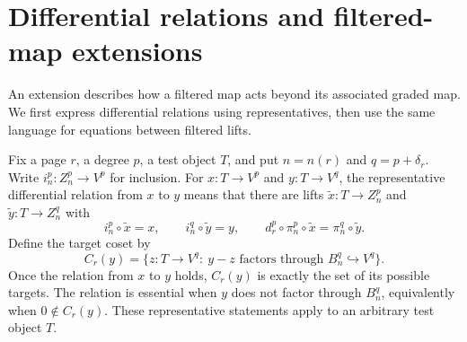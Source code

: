 \section{Differential relations and filtered-map extensions}

An extension describes how a filtered map acts beyond its associated
graded map. We first express differential relations using representatives,
then use the same language for equations between filtered lifts.

\begin{definition}
\label{sem:SpectralSequence:ambient-differential}
Fix a page $r$, a degree $p$, a test object $T$, and put
$n=n(r)$ and $q=p+\delta_r$. Write $i_n^p:Z_n^p\to V^p$ for inclusion.
For $x:T\to V^p$ and $y:T\to V^q$, the representative differential
relation from $x$ to $y$ means that there are lifts
$\widetilde x:T\to Z_n^p$ and $\widetilde y:T\to Z_n^q$ with
\[
 i_n^p\circ\widetilde x=x,\qquad
 i_n^q\circ\widetilde y=y,\qquad
 d_r^p\circ\pi_n^p\circ\widetilde x=\pi_n^q\circ\widetilde y.
\]
Define the target coset by
\[
 C_r(y)=\{z:T\to V^q:\ y-z\text{ factors through }B_n^q\hookrightarrow V^q\}.
\]
Once the relation from $x$ to $y$ holds, $C_r(y)$ is exactly the set of
its possible targets. The relation is essential when $y$ does not
factor through $B_n^q$, equivalently when $0\notin C_r(y)$. These
representative statements apply to an arbitrary test object $T$.
\end{definition}


